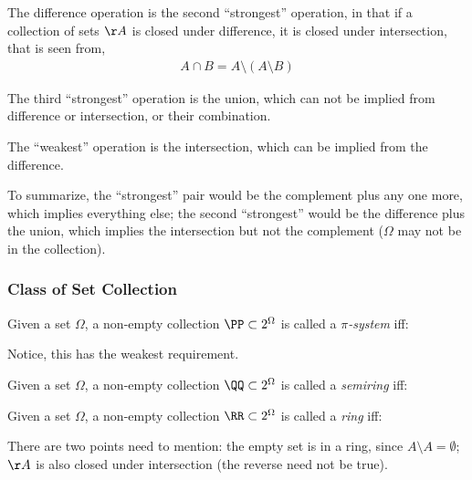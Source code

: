 \documentclass{memoir}
\begin{document}
The difference operation is the second ``strongest'' operation, in that if a collection of sets $\AA$ is closed under difference, it is closed under intersection, that is seen from,
\begin{align}
	A \cap B = A \setminus (A \setminus B)
\end{align}

The third ``strongest'' operation is the union, which can not be implied from difference or intersection, or their combination.

The ``weakest'' operation is the intersection, which can be implied from the difference.

To summarize, the ``strongest'' pair would be the complement plus any one more, which implies everything else; the second ``strongest'' would be the difference plus the union, which implies the intersection but not the complement ($\Omega$ may not be in the collection). \smallmarginpar{\textdbend}

\subsubsection{Class of Set Collection}
\begin{deff}
	Given a set $\Omega$, a non-empty collection $\PP \subset 2^\Omega$ is called a {\em{$\pi$-system}} iff:
	
\end{deff}
Notice, this has the weakest requirement.

\begin{deff}
	Given a set $\Omega$, a non-empty collection $\QQ \subset 2^\Omega$ is called a {\em{semiring}} iff:
	
\end{deff}

\begin{deff}
	Given a set $\Omega$, a non-empty collection $\RR \subset 2^\Omega$ is called a {\em{ring}} iff:
	
\end{deff}

There are two points need to mention: the empty set is in a ring, since $A \setminus A = \emptyset$; $\AA$ is also closed under intersection (the reverse need not be true).
\end{document}
